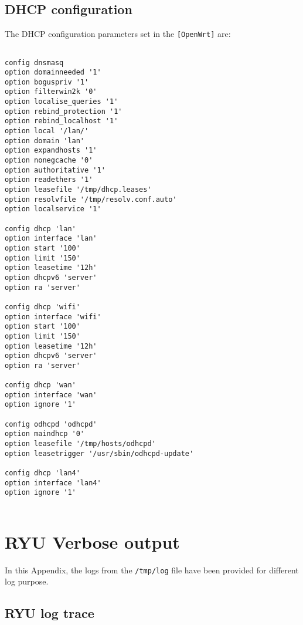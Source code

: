\section{DHCP configuration}\label{app:sec:DHCP_config}
The DHCP configuration parameters set in the \verb|[OpenWrt]| are:
\begin{lstlisting}[frame=single]

config dnsmasq
option domainneeded '1'
option boguspriv '1'
option filterwin2k '0'
option localise_queries '1'
option rebind_protection '1'
option rebind_localhost '1'
option local '/lan/'
option domain 'lan'
option expandhosts '1'
option nonegcache '0'
option authoritative '1'
option readethers '1'
option leasefile '/tmp/dhcp.leases'
option resolvfile '/tmp/resolv.conf.auto'
option localservice '1'

config dhcp 'lan'
option interface 'lan'
option start '100'
option limit '150'
option leasetime '12h'
option dhcpv6 'server'
option ra 'server'

config dhcp 'wifi'
option interface 'wifi'
option start '100'
option limit '150'
option leasetime '12h'
option dhcpv6 'server'
option ra 'server'

config dhcp 'wan'
option interface 'wan'
option ignore '1'

config odhcpd 'odhcpd'
option maindhcp '0'
option leasefile '/tmp/hosts/odhcpd'
option leasetrigger '/usr/sbin/odhcpd-update'

config dhcp 'lan4'
option interface 'lan4'
option ignore '1'


\end{lstlisting}

\chapter{RYU Verbose output}\label{app:ch:logs}

In this Appendix, the logs from the \verb|/tmp/log| file have been provided for different log purpose.

\section{RYU log trace}\label{app:sec:RYUlogtrace}

